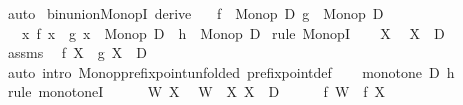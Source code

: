 \begin{isabellebody}
\ auto\isanewline
{}\isamarkupfalse%
%
\endisatagproof
{\isafoldproof}%
%
\isadelimproof
\isanewline
%
\endisadelimproof
\isanewline
{}\isamarkupfalse%
\ bin{\isacharunderscore}{\kern0pt}union{\isacharunderscore}{\kern0pt}MonopI\ {\isacharbrackleft}{\kern0pt}derive{\isacharbrackright}{\kern0pt}{\isacharcolon}{\kern0pt}\isanewline
\ \ \ {\isachardoublequoteopen}f\ {\isacharcolon}{\kern0pt}\ Monop\ D{\isachardoublequoteclose}\ {\isachardoublequoteopen}g\ {\isacharcolon}{\kern0pt}\ Monop\ D{\isachardoublequoteclose}\isanewline
\ \ \ {\isachardoublequoteopen}{\isacharparenleft}{\kern0pt}{\isasymlambda}x{\isachardot}{\kern0pt}\ f\ x\ {\isasymunion}\ g\ x{\isacharparenright}{\kern0pt}\ {\isacharcolon}{\kern0pt}\ Monop\ D{\isachardoublequoteclose}\ {\isacharparenleft}{\kern0pt}\ {\isachardoublequoteopen}{\isacharquery}{\kern0pt}h\ {\isacharcolon}{\kern0pt}\ Monop\ D{\isachardoublequoteclose}{\isacharparenright}{\kern0pt}\isanewline
%
\isadelimproof
%
\endisadelimproof
%
\isatagproof
{}\isamarkupfalse%
\ {\isacharparenleft}{\kern0pt}rule\ MonopI{\isacharparenright}{\kern0pt}\isanewline
\ \ \isamarkupfalse%
\ X\ \isamarkupfalse%
\ {\isachardoublequoteopen}X\ {\isasymsubseteq}\ D{\isachardoublequoteclose}\isanewline
\ \ \isamarkupfalse%
\ assms\ \isamarkupfalse%
\ {\isachardoublequoteopen}f\ X\ {\isasymunion}\ g\ X\ {\isasymsubseteq}\ D{\isachardoublequoteclose}\isanewline
\ \ \ \ \isamarkupfalse%
\ {\isacharparenleft}{\kern0pt}auto\ intro{\isacharbang}{\kern0pt}{\isacharcolon}{\kern0pt}\ Monop{\isacharunderscore}{\kern0pt}prefixpoint{\isacharbrackleft}{\kern0pt}unfolded\ prefixpoint{\isacharunderscore}{\kern0pt}def{\isacharbrackright}{\kern0pt}{\isacharparenright}{\kern0pt}\isanewline
{}\isamarkupfalse%
\isanewline
\ \ \isamarkupfalse%
\ {\isachardoublequoteopen}monotone\ D\ {\isacharquery}{\kern0pt}h{\isachardoublequoteclose}\isanewline
\ \ \isamarkupfalse%
\ {\isacharparenleft}{\kern0pt}rule\ monotoneI{\isacharparenright}{\kern0pt}\isanewline
\ \ \ \ \isamarkupfalse%
\ W\ X\ \isamarkupfalse%
\ {\isachardoublequoteopen}W\ {\isasymsubseteq}\ X{\isachardoublequoteclose}\ {\isachardoublequoteopen}X\ {\isasymsubseteq}\ D{\isachardoublequoteclose}\isanewline
\ \ \ \ \isamarkupfalse%
\ {\isachardoublequoteopen}f\ W\ {\isasymsubseteq}\ f\ X{\isachardoublequoteclose}\ \isamarkupfalse%

\end{isabellebody}
